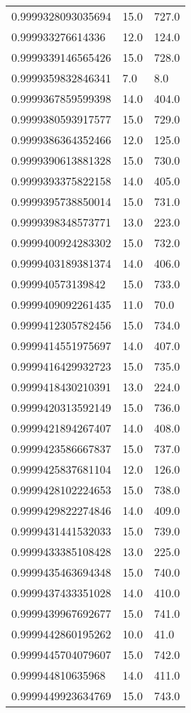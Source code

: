 \begin{center}
\begin{supertabular}[H]{p{0.30\textwidth}p{0.05\textwidth}p{0.05\textwidth}}
0.9999328093035694 & 15.0 & 727.0 \\ 
0.999933276614336 & 12.0 & 124.0 \\ 
0.9999339146565426 & 15.0 & 728.0 \\ 
0.9999359832846341 & 7.0 & 8.0 \\ 
0.9999367859599398 & 14.0 & 404.0 \\ 
0.9999380593917577 & 15.0 & 729.0 \\ 
0.9999386364352466 & 12.0 & 125.0 \\ 
0.9999390613881328 & 15.0 & 730.0 \\ 
0.9999393375822158 & 14.0 & 405.0 \\ 
0.9999395738850014 & 15.0 & 731.0 \\ 
0.9999398348573771 & 13.0 & 223.0 \\ 
0.9999400924283302 & 15.0 & 732.0 \\ 
0.9999403189381374 & 14.0 & 406.0 \\ 
0.999940573139842 & 15.0 & 733.0 \\ 
0.9999409092261435 & 11.0 & 70.0 \\ 
0.9999412305782456 & 15.0 & 734.0 \\ 
0.9999414551975697 & 14.0 & 407.0 \\ 
0.9999416429932723 & 15.0 & 735.0 \\ 
0.9999418430210391 & 13.0 & 224.0 \\ 
0.9999420313592149 & 15.0 & 736.0 \\ 
0.9999421894267407 & 14.0 & 408.0 \\ 
0.9999423586667837 & 15.0 & 737.0 \\ 
0.9999425837681104 & 12.0 & 126.0 \\ 
0.9999428102224653 & 15.0 & 738.0 \\ 
0.9999429822274846 & 14.0 & 409.0 \\ 
0.9999431441532033 & 15.0 & 739.0 \\ 
0.9999433385108428 & 13.0 & 225.0 \\ 
0.9999435463694348 & 15.0 & 740.0 \\ 
0.9999437433351028 & 14.0 & 410.0 \\ 
0.9999439967692677 & 15.0 & 741.0 \\ 
0.9999442860195262 & 10.0 & 41.0 \\ 
0.9999445704079607 & 15.0 & 742.0 \\ 
0.999944810635968 & 14.0 & 411.0 \\ 
0.9999449923634769 & 15.0 & 743.0 \\ 

\end{supertabular}
\end{center}
